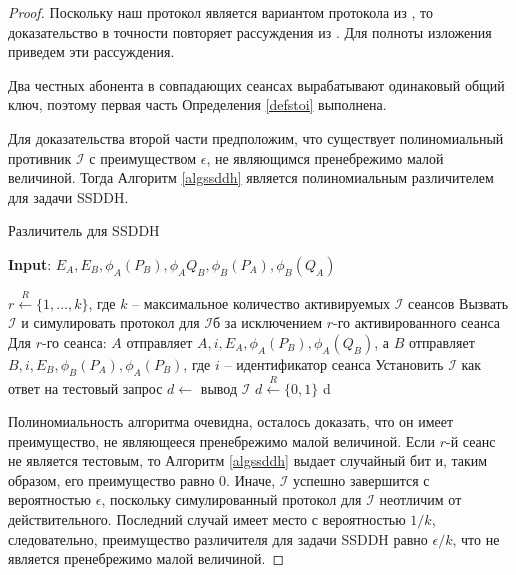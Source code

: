 \documentclass[a4paper,12pt]{article}
\theoremstyle{definition}
\begin{document}
\begin{proof}
 Поскольку наш протокол является вариантом протокола из \cite{DF}, то доказательство в точности повторяет рассуждения из \cite[Theorem 6.1]{DF}. Для полноты изложения приведем эти рассуждения.

Два честных абонента в совпадающих сеансах вырабатывают одинаковый общий ключ, поэтому первая часть Определения \ref{defstoi} выполнена.

Для доказательства второй части предположим, что существует полиномиальный противник $\mathcal{I}$ с преимуществом $\epsilon$, не являющимся пренебрежимо малой величиной.
Тогда Алгоритм \ref{algssddh} является полиномиальным различителем для задачи SSDDH.

\begin{algorithm}
\caption{Различитель для SSDDH}
 \label{algssddh}
\textbf{Input}:   $E_A, E_B, \phi_A(P_B),\phi_A{Q_B},\phi_B(P_A),\phi_B(Q_A)$\\
 \begin{algorithmic}[1]
  \State $r\stackrel{R}{\gets}\{1,\dots,k\}$, где $k$ -- максимальное количество активируемых $\mathcal{I}$ сеансов
  \State Вызвать $\mathcal{I}$ и симулировать протокол для $\mathcal{I}$б за исключением $r$-го активированного сеанса
  \State Для $r$-го сеанса: $A$ отправляет $A,i,E_A,\phi_A(P_B),\phi_A(Q_B)$, а $B$ отправляет $B,i,E_B,\phi_B(P_A),\phi_A(P_B)$, где $i$ -- идентификатор сеанса
  \State Установить $\mathcal{I}$ как ответ на тестовый запрос
  \State $d\gets $ вывод $\mathcal{I}$
  \Else 
  \State $d\stackrel{R}{\gets}\{0,1\}$
  \EndIf
  \State \Return d
 \end{algorithmic}

\end{algorithm}

Полиномиальность алгоритма очевидна, осталось доказать, что он имеет преимущество, не являющееся пренебрежимо малой величиной.
Если $r$-й сеанс не является тестовым, то Алгоритм \ref{algssddh} выдает случайный бит и, таким образом, его преимущество равно $0$.
Иначе, $\mathcal{I}$  успешно завершится с вероятностью $\epsilon$, поскольку симулированный протокол для $\mathcal{I}$  неотличим от действительного.
Последний случай имеет место с вероятностью $1/k$, следовательно, преимущество различителя для задачи SSDDH равно $\epsilon/k$, что не является пренебрежимо малой величиной.
 

 
 
 \end{proof}
\end{document}
